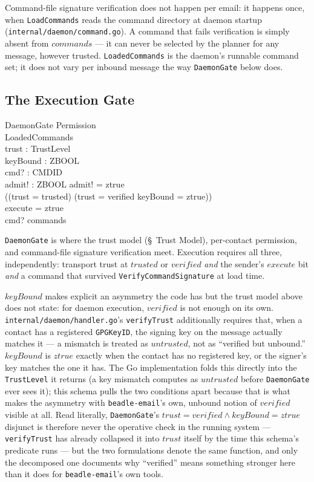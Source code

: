 \documentclass[a4paper,10pt,fleqn]{article}
\begin{document}
Command-file signature verification does not happen per email: it
happens once, when \texttt{LoadCommands} reads the command directory
at daemon startup (\texttt{internal/daemon/command.go}).  A command
that fails verification is simply absent from $commands$ --- it can
never be selected by the planner for any message, however trusted.
\texttt{LoadedCommands} is the daemon's runnable command set; it
does not vary per inbound message the way \texttt{DaemonGate} below
does.

\subsection{The Execution Gate}

\begin{schema}{DaemonGate}
  Permission \\
  LoadedCommands \\
  trust : TrustLevel \\
  keyBound : ZBOOL \\
  cmd? : CMDID \\
  admit! : ZBOOL
  \where
  admit! = ztrue \iff \\
  \quad ((trust = trusted) \lor (trust = verified \land keyBound = ztrue)) \\
  \quad \land execute = ztrue \\
  \quad \land cmd? \in commands
\end{schema}

\texttt{DaemonGate} is where the trust model (\S~Trust Model),
per-contact permission, and command-file signature verification
meet.  Execution requires all three, independently: transport trust
at $trusted$ or $verified$ \emph{and} the sender's $execute$ bit
\emph{and} a command that survived \texttt{VerifyCommandSignature}
at load time.

$keyBound$ makes explicit an asymmetry the code has but the trust
model above does not state: for daemon execution, $verified$ is not
enough on its own.  \texttt{internal/daemon/handler.go}'s
\texttt{verifyTrust} additionally requires that, when a contact has
a registered \texttt{GPGKeyID}, the signing key on the message
actually matches it --- a mismatch is treated as $untrusted$, not as
``verified but unbound.''  $keyBound$ is $ztrue$ exactly when the
contact has no registered key, or the signer's key matches the one
it has.  The Go implementation folds this directly into the
\texttt{TrustLevel} it returns (a key mismatch computes as
$untrusted$ before \texttt{DaemonGate} ever sees it); this schema
pulls the two conditions apart because that is what makes the
asymmetry with \texttt{beadle-email}'s own, unbound notion of
$verified$ visible at all.  Read literally, \texttt{DaemonGate}'s
$trust = verified \land keyBound = ztrue$ disjunct is therefore
never the operative check in the running system ---
\texttt{verifyTrust} has already collapsed it into $trust$ itself by
the time this schema's predicate runs --- but the two formulations
denote the same function, and only the decomposed one documents why
``verified'' means something stronger here than it does for
\texttt{beadle-email}'s own tools.
\end{document}
